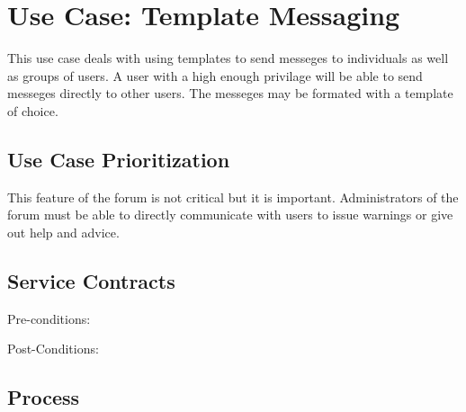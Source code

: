 \documentclass[a4paper,12pt]{article}
\begin{document}
\section{Use Case: Template Messaging}
This use case deals with using templates to send messeges to individuals as well as groups of users. A user with a high enough privilage will be able to send messeges directly to other users. The messeges may be formated with a template of choice.

\subsection{Use Case Prioritization}
This feature of the forum is not critical but it is important. Administrators of the forum must be able to directly communicate with users to issue warnings or give out help and advice.

\subsection{Service Contracts}
Pre-conditions: 
\begin{itemize}
\end{itemize}
      
Post-Conditions:
\begin{itemize}
\end{itemize}
      
\subsection{Process}
\end{document}

